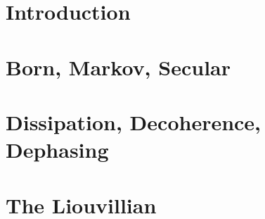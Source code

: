 \section{Introduction}

\section{Born, Markov, Secular}

\section{Dissipation, Decoherence, Dephasing}

\section{The Liouvillian}